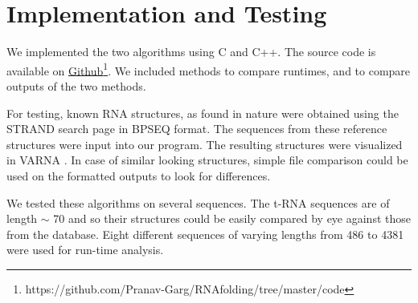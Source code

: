 \documentclass[journal]{IEEEtran}
\begin{document}


\section{Implementation and Testing}

We implemented the two algorithms using C and C++. The source code is available on \href{https://github.com/Pranav-Garg/RNAfolding/tree/master/code}{Github}\footnote{https://github.com/Pranav-Garg/RNAfolding/tree/master/code}. We included methods to compare runtimes, and to compare outputs of the two methods.

For testing, known RNA structures, as found in nature were obtained using the STRAND search page \cite{strand} in BPSEQ format. The sequences from these reference structures were input into our program. The resulting structures were visualized in VARNA \cite{varna}. In case of similar looking structures, simple file comparison could be used on the formatted outputs to look for differences.

We tested these algorithms on several sequences. The t-RNA sequences are of length $\sim$ 70 and so their structures could be easily compared by eye against those from the database. Eight different sequences of varying lengths from 486 to 4381 were used for run-time analysis.
\end{document}
